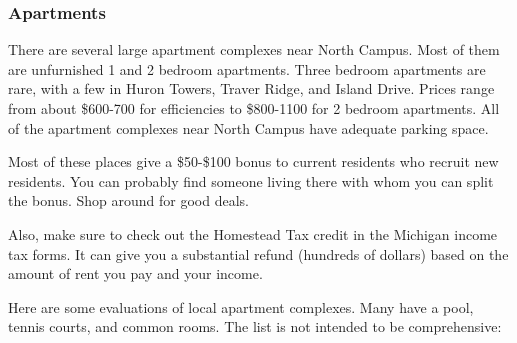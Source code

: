 \documentclass[11pt]{article}
\begin{document}
\subsubsection{Apartments}
\label{sec-10_1_4}

There are several large apartment complexes near North Campus.  Most
of them are unfurnished 1 and 2 bedroom apartments.  Three bedroom
apartments are rare, with a few in Huron Towers, Traver Ridge, and
Island Drive.  Prices range from about \$600-700 for efficiencies to
\$800-1100 for 2 bedroom apartments. All of the apartment complexes
near North Campus have adequate parking space.

Most of these places give a \$50-\$100 bonus to current residents who
recruit new residents. You can probably find someone living there with
whom you can split the bonus. Shop around for good deals.

Also, make sure to check out the Homestead Tax credit in the Michigan
income tax forms.  It can give you a substantial refund (hundreds of
dollars) based on the amount of rent you pay and your income.

Here are some evaluations of local apartment complexes. Many have a
pool, tennis courts, and common rooms. The list is not intended to be
comprehensive:
\end{document}
